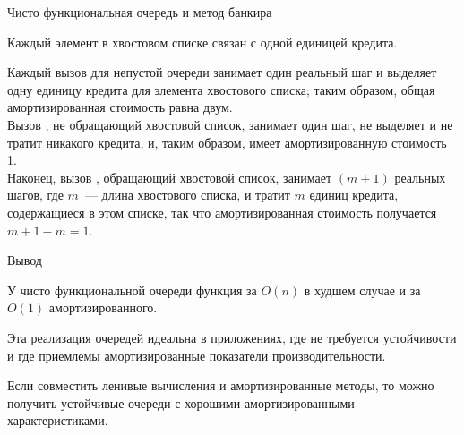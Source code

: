 \begin{frame}{Чисто функциональная очередь и метод банкира}
\begin{definition}[Инвариант]
Каждый элемент в хвостовом списке связан с одной единицей кредита.
\end{definition}

Каждый вызов
 для непустой очереди занимает один реальный шаг и
выделяет одну единицу кредита для элемента хвостового списка; таким
образом, общая амортизированная стоимость равна двум. \\

Вызов
, не обращающий хвостовой список, занимает один шаг,
не выделяет и не тратит никакого кредита, и, таким образом, имеет
амортизированную стоимость 1. \\

Наконец, вызов ,
обращающий хвостовой список, занимает $(m+1)$ реальных шагов, где $m$~---
длина хвостового списка, и тратит $m$ единиц кредита, содержащиеся в
этом списке, так что амортизированная стоимость получается $m + 1 - m
= 1$.
\end{frame}


%
%
%

\begin{frame}{Вывод}

У чисто функциональной очереди функция  за $O(n)$ в худшем случае и за $O(1)$ амортизированного.\\

\begin{hint}
  Эта реализация очередей идеальна в приложениях, где не требуется
  устойчивости и где приемлемы амортизированные показатели
  производительности.
\end{hint}

Если совместить ленивые вычисления и амортизированные методы, то можно получить устойчивые очереди с хорошими амортизированными характеристиками.
\end{frame}

